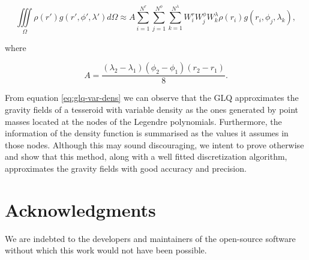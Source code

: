 \documentclass[extra]{gji}
\begin{document}
{
\begin{equation}
    \iiint\limits_\Omega \rho(r') g(r', \phi', \lambda') d\Omega \approx
    A 
    \sum\limits_{i=1}^{N^r}
    \sum\limits_{j=1}^{N^\phi}
    \sum\limits_{k=1}^{N^\lambda}
    W_i^r W_j^\phi W_k^\lambda \rho(r_i) g(r_i, \phi_j, \lambda_k),
\label{eq:glq-var-dens}
\end{equation}
}

\noindent where

\begin{equation}
    A = 
    \frac{(\lambda_2 - \lambda_1)(\phi_2 - \phi_1)(r_2 - r_1)}{8}.
\end{equation}

From equation \ref{eq:glq-var-dens} we can observe that the GLQ approximates the gravity fields of a tesseroid with variable density as the ones generated by point masses located at the nodes of the Legendre polynomials.
Furthermore, the information of the density function is summarised as the values it assumes in those nodes.
Although this may sound discouraging, we intent to prove otherwise and show that this method, along with a well fitted discretization algorithm, approximates the gravity fields with good accuracy and precision.




\section{Acknowledgments}

We are indebted to the developers and maintainers of the open-source
software without which this work would not have been possible.




\end{document}
